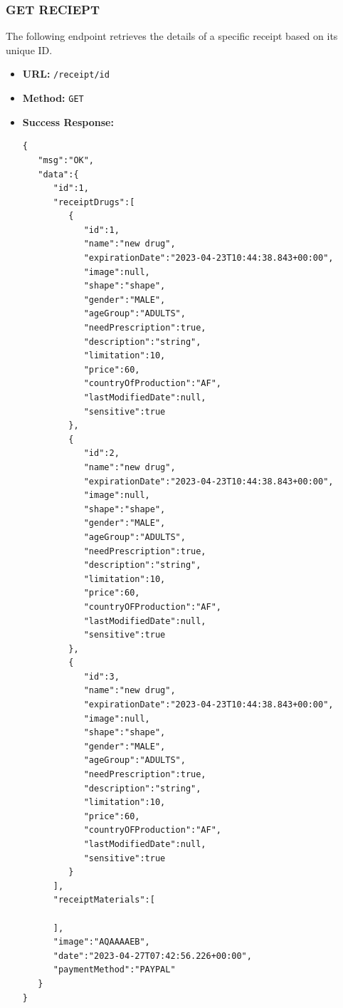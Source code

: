 \subsubsection*{GET RECIEPT}
The following endpoint retrieves the details of a specific receipt based on its unique ID.
\begin{itemize}
    \item \textbf{URL:}
    \newline \hspace*{1cm} \texttt{/receipt/{id}}  
    \item \textbf{Method:}
    \newline \hspace*{1cm}\texttt{GET}
    \item \textbf{Success Response:}
\begin{lstlisting}[breaklines]
{
   "msg":"OK",
   "data":{
      "id":1,
      "receiptDrugs":[
         {
            "id":1,
            "name":"new drug",
            "expirationDate":"2023-04-23T10:44:38.843+00:00",
            "image":null,
            "shape":"shape",
            "gender":"MALE",
            "ageGroup":"ADULTS",
            "needPrescription":true,
            "description":"string",
            "limitation":10,
            "price":60,
            "countryOfProduction":"AF",
            "lastModifiedDate":null,
            "sensitive":true
         },
         {
            "id":2,
            "name":"new drug",
            "expirationDate":"2023-04-23T10:44:38.843+00:00",
            "image":null,
            "shape":"shape",
            "gender":"MALE",
            "ageGroup":"ADULTS",
            "needPrescription":true,
            "description":"string",
            "limitation":10,
            "price":60,
            "countryOFProduction":"AF",
            "lastModifiedDate":null,
            "sensitive":true
         },
         {
            "id":3,
            "name":"new drug",
            "expirationDate":"2023-04-23T10:44:38.843+00:00",
            "image":null,
            "shape":"shape",
            "gender":"MALE",
            "ageGroup":"ADULTS",
            "needPrescription":true,
            "description":"string",
            "limitation":10,
            "price":60,
            "countryOFProduction":"AF",
            "lastModifiedDate":null,
            "sensitive":true
         }
      ],
      "receiptMaterials":[
         
      ],
      "image":"AQAAAAEB",
      "date":"2023-04-27T07:42:56.226+00:00",
      "paymentMethod":"PAYPAL"
   }
}
\end{lstlisting}
\end{itemize}

